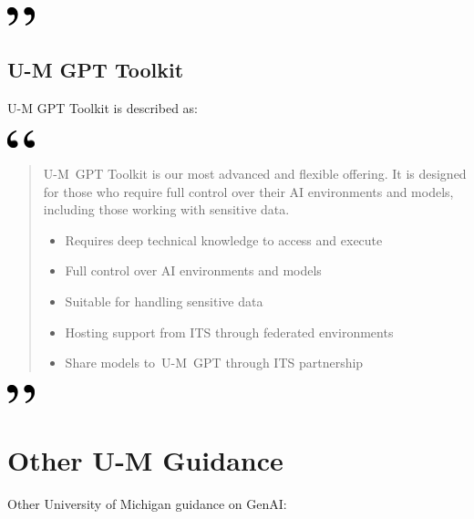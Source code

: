 \documentclass[
]{book}
\begin{document}
\includegraphics[width=0.3125in,height=0.20833in]{close.png}

\hypertarget{u-m-gpt-toolkit}{%
\subsection{U-M GPT Toolkit}\label{u-m-gpt-toolkit}}

U-M GPT Toolkit is described as:

\includegraphics[width=0.3125in,height=0.20833in]{open.png}

\begin{quote}
U-M~GPT Toolkit is our most advanced and flexible offering. It is designed for those who require full control over their AI environments and models, including those working with sensitive data.

\begin{itemize}
\item
  Requires deep technical knowledge to access and execute
\item
  Full control over AI environments and models
\item
  Suitable for handling sensitive data
\item
  Hosting support from ITS through federated environments
\item
  Share models to~U-M~GPT through ITS partnership
\end{itemize}
\end{quote}

\includegraphics[width=0.3125in,height=0.20833in]{close.png}

\hypertarget{other-u-m-guidance}{%
\section{Other U-M Guidance}\label{other-u-m-guidance}}

Other University of Michigan guidance on GenAI:
\end{document}
